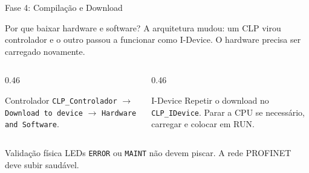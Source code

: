 \documentclass[10pt, aspectratio=169]{beamer}
\begin{document}
\begin{frame}{Fase 4: Compila\c{c}\~ao e Download}
    \small
    \begin{block}{Por que baixar hardware e software?}
        A arquitetura mudou: um CLP virou controlador e o outro passou a funcionar como I-Device. O hardware precisa ser carregado novamente.
    \end{block}

    \begin{columns}[T,totalwidth=\textwidth]
        \begin{column}{0.46\textwidth}
            \begin{block}{Controlador}
                \texttt{CLP\_Controlador} $\rightarrow$ \texttt{Download to device} $\rightarrow$ \texttt{Hardware and Software}.
            \end{block}
        \end{column}
        \begin{column}{0.46\textwidth}
            \begin{block}{I-Device}
                Repetir o download no \texttt{CLP\_IDevice}. Parar a CPU se necess\'ario, carregar e colocar em RUN.
            \end{block}
        \end{column}
    \end{columns}

    \vspace{0.25cm}
    \begin{block}{Valida\c{c}\~ao f\'isica}
        LEDs \texttt{ERROR} ou \texttt{MAINT} n\~ao devem piscar. A rede PROFINET deve subir saud\'avel.
    \end{block}
\end{frame}
\end{document}
